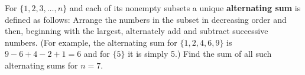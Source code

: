 For $\{1, 2, 3, \dots, n\}$ and each of its nonempty subsets a unique \textbf{alternating sum} is defined as follows: Arrange the numbers in the subset in decreasing order and then, beginning with the largest, alternately add and subtract successive numbers.  (For example, the alternating sum for $\{1, 2, 4, 6, 9\}$ is $9 - 6 + 4 - 2 + 1 = 6$ and for $\{5\}$ it is simply 5.)  Find the sum of all such alternating sums for $n = 7$.